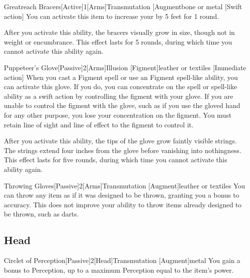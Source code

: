         \begin{magicitemdef}{Greatreach Bracers}[Active]{1}[Arms]{Transmutation [Augment}{bone or metal}
                [Swift action] You can activate this item to increase your  by 5 feet for 1 round.

                After you activate this ability, the bracers visually grow in size, though not in weight or encumbrance.
                This effect lasts for 5 rounds, during which time you cannot activate this ability again.
            \end{magicitemdef}

            \begin{magicitemdef}{Puppeteer's Glove}[Passive]{2}[Arms]{Illusion [Figment]}{leather or textiles}
                [Immediate action] When you cast a Figment spell or use an Figment spell-like ability, you can activate this glove.
                If you do, you can concentrate on the spell or spell-like ability as a swift action by controlling the figment with your glove.
                If you are unable to control the figment with the glove, such as if you use the gloved hand for any other purpose, you lose your concentration on the figment.
                You must retain line of sight and line of effect to the figment to control it.

                After you activate this ability, the tips of the glove grow faintly visible strings.
                The strings extend four inches from the glove before vanishing into nothingness.
                This effect lasts for five rounds, during which time you cannot activate this ability again.
            \end{magicitemdef}

            \begin{magicitemdef}{Throwing Gloves}[Passive]{2}[Arms]{Transmutation [Augment]}{leather or textiles}
                 You can throw any item as if it was designed to be thrown, granting you a  bonus to accuracy.
                This does not improve your ability to throw items already designed to be thrown, such as darts.
            \end{magicitemdef}

        \subsection{Head}

            \begin{magicitemdef}{Circlet of Perception}[Passive]{2}[Head]{Transmutation [Augment]}{metal}
                 You gain a  bonus to Perception, up to a maximum Perception equal to the item's power.
            \end{magicitemdef}

